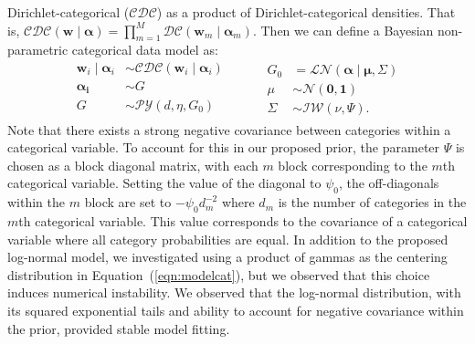     Dirichlet-categorical ($\mathcal{CDC}$) as a product of 
    Dirichlet-categorical densities.  That is, 
    $\mathcal{CDC}(\bm{w}\mid\bm{\alpha}) = 
        \prod_{m = 1}^M\mathcal{DC}(\bm{w}_m\mid\bm{\alpha}_m)$.
    Then we can define a Bayesian non-parametric categorical data model as:
    \begin{equation}
      \label{eqn:modelcat}
      \begin{aligned}
      \bm{w}_i \mid \bm{\alpha}_i &\sim 
        \mathcal{CDC}\left(\bm{w}_i\mid\bm{\alpha}_i\right)\\
      \bm{\alpha_i} &\sim G\\
      G &\sim \mathcal{PY}\left(d, \eta, G_0\right)\\
      \end{aligned}
      ~\hspace{1cm}
      \begin{aligned}
      G_0 &= \mathcal{LN}\left(\bm{\alpha}\mid\bm{\mu},\Sigma\right)\\
      \mu &\sim \mathcal{N}\left(\bm{0},\bm{1}\right)\\
      \Sigma &\sim \mathcal{IW}\left(\nu, \Psi\right).
      \end{aligned}
    \end{equation}
    Note that there  exists a strong negative covariance between categories 
    within a categorical variable.  To account for this in our proposed prior, the 
    parameter $\Psi$ is chosen as a block diagonal matrix, with each $m$ block 
    corresponding to the $m$th categorical variable.  Setting the value of the diagonal 
    to $\psi_0$, the off-diagonals within the $m$ block are set to $-\psi_0 d_m^{-2}$ 
    where $d_m$ is the number of categories in the $m$th categorical variable.
    This value corresponds to the covariance of a categorical variable where all 
    category probabilities are equal. In addition to the proposed log-normal model,
    we investigated using a product of gammas as the centering distribution in
    Equation~(\ref{eqn:modelcat}), but we observed that this choice induces
    numerical instability.  We observed that the log-normal distribution, with
    its squared exponential tails and ability to account for negative covariance
    within the prior, provided stable model fitting.

